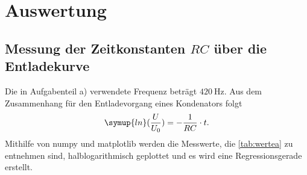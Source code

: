 \section{Auswertung}
\label{sec:Auswertung}

\subsection{Messung der Zeitkonstanten $RC$ über die Entladekurve}
Die in Aufgabenteil a) verwendete Frequenz beträgt $\SI{420}{\hertz}$. Aus dem Zusammenhang für den Entladevorgang eines Kondenators folgt
\begin{align}
    \symup{ln}(\frac{U}{U_{0}}) = -\frac{1}{RC}\cdot t.
\end{align}
Mithilfe von numpy \cite{numpy} und matplotlib \cite{matplotlib} werden die Messwerte, die
\autoref{tab:wertea} zu entnehmen sind, halblogarithmisch geplottet und es wird eine Regressionsgerade erstellt.


